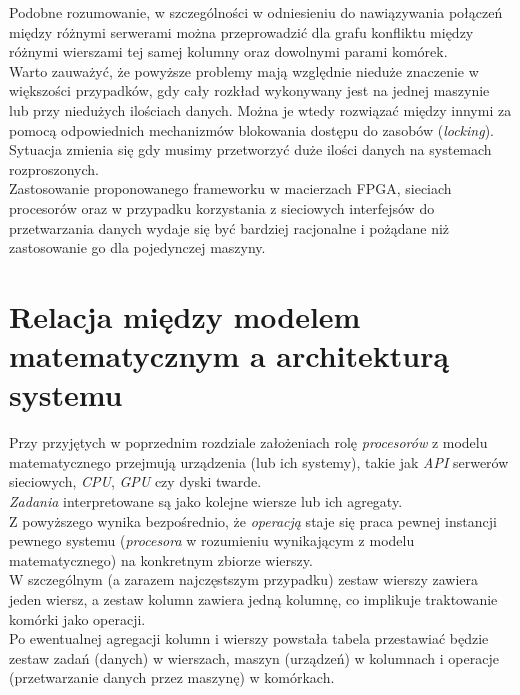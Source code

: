 \documentclass[brudnopis]{xmgr}
\begin{document}
Podobne rozumowanie, w szczególności w odniesieniu do nawiązywania połączeń między różnymi serwerami można przeprowadzić dla grafu konfliktu między różnymi wierszami tej samej kolumny oraz dowolnymi parami komórek.
\medskip\\

Warto zauważyć, że powyższe problemy mają względnie nieduże znaczenie w większości przypadków, gdy cały rozkład wykonywany jest na jednej maszynie lub przy niedużych ilościach danych. Można je wtedy rozwiązać między innymi za pomocą odpowiednich mechanizmów blokowania dostępu do zasobów (\emph{locking}).
Sytuacja zmienia się gdy musimy przetworzyć duże ilości danych na systemach rozproszonych.
\medskip\\

Zastosowanie proponowanego frameworku w macierzach FPGA, sieciach procesorów oraz w przypadku korzystania z sieciowych interfejsów do przetwarzania danych wydaje się być bardziej racjonalne i pożądane niż zastosowanie go dla pojedynczej maszyny.

\chapter{Relacja między modelem matematycznym a architekturą systemu}

Przy przyjętych w poprzednim rozdziale założeniach rolę \emph{procesorów} z modelu matematycznego przejmują urządzenia (lub ich systemy), takie jak \emph{API} serwerów sieciowych, \emph{CPU}, \emph{GPU} czy dyski twarde.
\medskip\\

\emph{Zadania} interpretowane są jako kolejne wiersze lub ich agregaty.
\medskip\\

Z powyższego wynika bezpośrednio, że \emph{operacją} staje się praca pewnej instancji pewnego systemu (\emph{procesora} w rozumieniu wynikającym z modelu matematycznego) na konkretnym zbiorze wierszy.
\medskip\\

W szczególnym (a zarazem najczęstszym przypadku) zestaw wierszy zawiera jeden wiersz, a zestaw kolumn zawiera jedną kolumnę, co implikuje traktowanie komórki jako operacji.
\medskip\\

Po ewentualnej agregacji kolumn i wierszy powstała tabela przestawiać będzie zestaw zadań (danych) w wierszach, maszyn (urządzeń) w kolumnach i operacje (przetwarzanie danych przez maszynę) w komórkach.
\end{document}

